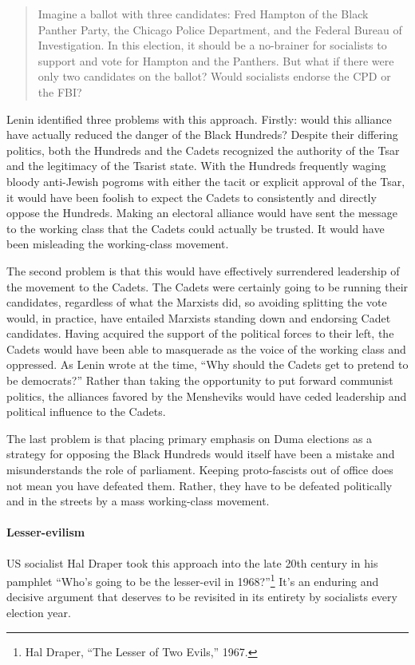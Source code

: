\blockquote{Imagine a ballot with three candidates: Fred Hampton of the Black Panther Party, the Chicago Police Department, and the Federal Bureau of Investigation. In this election, it should be a no-brainer for socialists to support and vote for Hampton and the Panthers. But what if there were only two candidates on the ballot? Would socialists endorse the CPD or the FBI?}

Lenin identified three problems with this approach. Firstly: would this alliance have actually reduced the danger of the Black Hundreds? Despite their differing politics, both the Hundreds and the Cadets recognized the authority of the Tsar and the legitimacy of the Tsarist state. With the Hundreds frequently waging bloody anti-Jewish pogroms with either the tacit or explicit approval of the Tsar, it would have been foolish to expect the Cadets to consistently and directly oppose the Hundreds. Making an electoral alliance would have sent the message to the working class that the Cadets could actually be trusted. It would have been misleading the working-class movement.

The second problem is that this would have effectively surrendered leadership of the movement to the Cadets. The Cadets were certainly going to be running their candidates, regardless of what the Marxists did, so avoiding splitting the vote would, in practice, have entailed Marxists standing down and endorsing Cadet candidates. Having acquired the support of the political forces to their left, the Cadets would have been able to masquerade as the voice of the working class and oppressed. As Lenin wrote at the time, ``Why should the Cadets get to pretend to be democrats?'' Rather than taking the opportunity to put forward communist politics, the alliances favored by the Mensheviks would have ceded leadership and political influence to the Cadets.

The last problem is that placing primary emphasis on Duma elections as a strategy for opposing the Black Hundreds would itself have been a mistake and misunderstands the role of parliament. Keeping proto-fascists out of office does not mean you have defeated them. Rather, they have to be defeated politically and in the streets by a mass working-class movement.

\paragraph{Lesser-evilism}

US socialist Hal Draper took this approach into the late 20th century in his pamphlet ``Who's going to be the lesser-evil in 1968?''\footnote{Hal Draper, ``The Lesser of Two Evils,'' 1967.} It's an enduring and decisive argument that deserves to be revisited in its entirety by socialists every election year.

